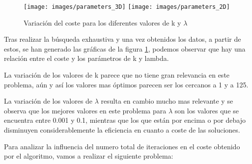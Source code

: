 \documentclass{article}
\begin{document}
\begin{enumerate}
  \begin{figure}[htp]
    \centering
    \texttt{[image: images/parameters\_3D]}\hfill
    \texttt{[image: images/parameters\_2D]}\hfill
    \caption{Variación del coste para los diferentes valores de k y ${\lambda}$}
    \label{fig:CC}
  \end{figure}
  Tras realizar la búsqueda exhaustiva y una vez obtenidos los datos, a partir de estos, se han generado las gráficas de la figura \ref{fig:CC}, podemos observar que hay una relación entre el coste y los parámetros de k y lambda.\par
  La variación de los valores de k parece que no tiene gran relevancia en este problema, aún y así los valores mas óptimos parecen ser los cercanos a 1 y a 125.\par
  La variación de los valores de ${\lambda}$ resulta en cambio mucho mas relevante y se observa que los mejores valores en este problema para ${\lambda}$ son los valores que se encuentra entre 0.001 y 0.1, mientras que los que están por encima o por debajo disminuyen considerablemente la eficiencia en cuanto a coste de las soluciones.\par
  Para analizar la influencia del numero total de iteraciones en el coste obtenido por el algoritmo, vamos a realizar el siguiente problema:


\end{enumerate}
\end{document}
